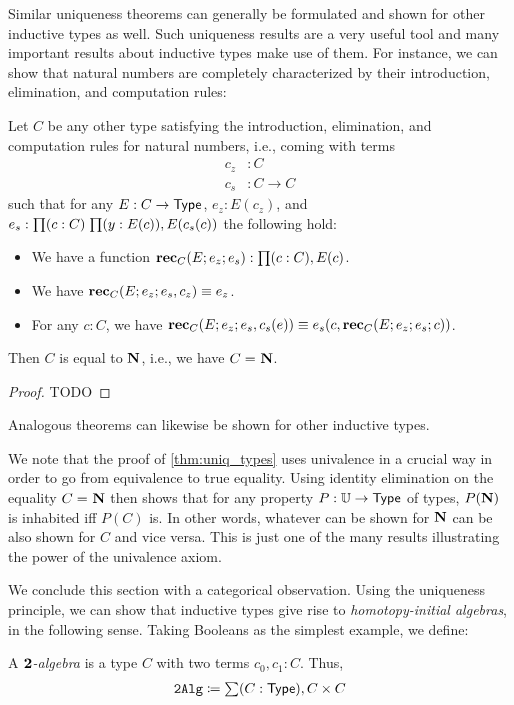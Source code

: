 Similar uniqueness theorems can generally be formulated and shown for other inductive types as well. Such uniqueness results are a very useful tool and many important results about inductive types make use of them. For instance, we can show that natural numbers are completely characterized by their introduction, elimination, and computation rules:

\begin{thm}\label{thm:uniq_types}
Let $C$ be any other type satisfying the introduction, elimination, and computation rules for natural numbers, i.e., coming with terms 
\begin{align*}
c_z & : C \\
c_s & : C \to C
\end{align*}
such that for any $E : C \to \mathsf{Type}$, $e_z : E(c_z)$, and $e_s : \prd{c : C}{y : E(c)} E(c_s(c))$ the following hold:
\begin{itemize}
\item We have a function $\rec_C(E;e_z;e_s) : \prd{c:C} E(c)$.
\item We have $\mathbf{rec}_C(E;e_z;e_s,c_z) \equiv e_z$.
\item For any $c : C$, we have $\mathbf{rec}_C(E;e_z;e_s,c_s(e)) \equiv e_s(c,\mathbf{rec}_C(E;e_z;e_s;c))$.
\end{itemize}
Then $C$ is equal to $\mathbf{N}$, i.e., we have $C =_{} \mathbf{N}$.
\end{thm}
\begin{proof}
TODO
\end{proof}
Analogous theorems can likewise be shown for other inductive types.

We note that the proof of \ref{thm:uniq_types} uses univalence in a crucial way in order to go from equivalence to true equality. Using identity elimination on the equality $C =_{} \mathbf{N}$ then shows that for any property $P : \mathbb{U} \to \mathsf{Type}$ of types, $P(\mathbf{N})$ is inhabited iff $P(C)$ is. In other words, whatever can be shown for $\mathbf{N}$ can be also shown for $C$ and vice versa. This is just one of the many results illustrating the power of the univalence axiom.

We conclude this section with a categorical observation. Using the uniqueness principle, we can show that inductive types give rise to \emph{homotopy-initial algebras}, in the following sense. Taking Booleans as the simplest example, we define:

\begin{defn}
A \emph{$\mathbf{2}$-algebra} is a type $C$ with two terms $c_0, c_1 : C$. Thus,
\begin{align*}
\mathtt{2Alg} \defeq \sm {C : \type} C \times C
\end{align*}
\end{defn}

